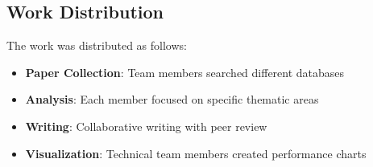\documentclass[12pt,a4paper]{article}
\begin{document}
\subsection{Work Distribution}
The work was distributed as follows:
\begin{itemize}
    \item \textbf{Paper Collection}: Team members searched different databases
    \item \textbf{Analysis}: Each member focused on specific thematic areas
    \item \textbf{Writing}: Collaborative writing with peer review
    \item \textbf{Visualization}: Technical team members created performance charts
\end{itemize}
\end{document}
